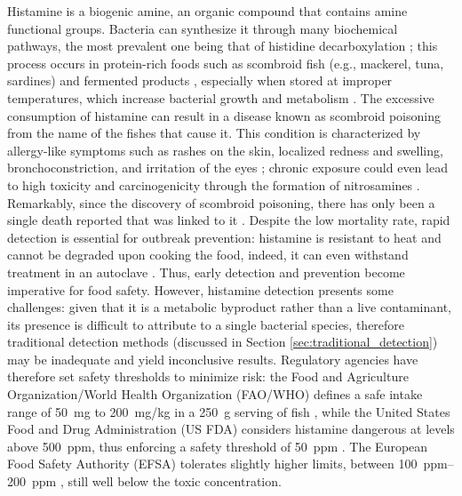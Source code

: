 Histamine is a biogenic amine, \ie{} an organic compound that contains amine
functional groups. Bacteria can synthesize it through many biochemical pathways,
the most prevalent one being that of histidine decarboxylation
\citep{maijalaEffect1993}; this process occurs in protein-rich foods such as
scombroid fish (e.g., mackerel, tuna, sardines) \citep{halsteadFish1964} and
fermented products \citep{spanoBiogenic2010, pretiFast2015}, especially when
stored at improper temperatures, which increase bacterial growth and metabolism
\citep{landeteUpdated2008}. The excessive consumption of histamine can result in
a disease known as scombroid poisoning from the name of the fishes that cause
it. This condition is characterized by allergy-like symptoms such as rashes on
the skin, localized redness and swelling, bronchoconstriction, and irritation of
the eyes \citep{ozogulBiogenic2019, taylorHistamine1986}; chronic exposure could
even lead to high toxicity and carcinogenicity through the formation of
nitrosamines \citep{bartschRelevance1984}. Remarkably, since the discovery of
scombroid poisoning, there has only been a single death reported that was linked
to it \citep{taylorHistamine1989}. Despite the low mortality rate, rapid
detection is essential for outbreak prevention: histamine is resistant to heat
and cannot be degraded upon cooking the food, indeed, it can even withstand
treatment in an autoclave \citep{efsaScientific2015}. Thus, early detection and
prevention become imperative for food safety. However, histamine detection
presents some challenges: given that it is a metabolic byproduct rather than a
live contaminant, its presence is difficult to attribute to a single bacterial
species, therefore traditional detection methods (discussed in Section
\ref{sec:traditional_detection}) may be inadequate and yield inconclusive
results. Regulatory agencies have therefore set safety thresholds to minimize
risk: the Food and Agriculture Organization/World Health Organization (FAO/WHO)
defines a safe intake range of \SI{50}{mg} to \SI{200}{mg/kg} in a \SI{250}{g}
serving of fish \citep{faowhoJoint2012}, while the United States Food and Drug
Administration (US FDA) considers histamine dangerous at levels above
\SI{500}{ppm}, thus enforcing a safety threshold of \SI{50}{ppm}
\citep{fdaFish2022}. The European Food Safety Authority (EFSA) tolerates
slightly higher limits, between \SIrange{100}{200}{ppm}
\citep{strokaEquivalence2014}, still well below the toxic concentration.

